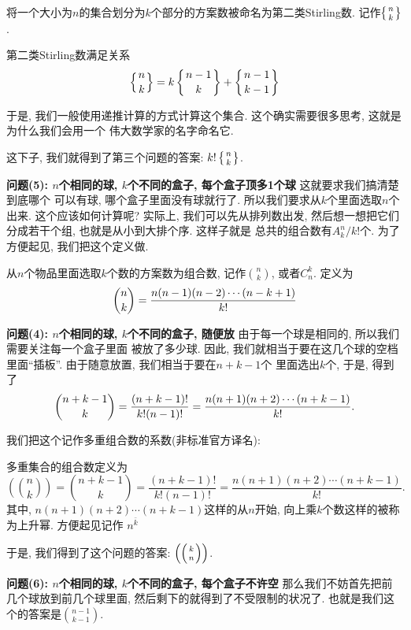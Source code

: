 \begin{definition}[第二类Stirling数]
    将一个大小为$n$的集合划分为$k$个部分的方案数被命名为第二类Stirling数. 记作$\left\{{n \atop k}\right\}$.
\end{definition}

\begin{theorem}
    第二类Stirling数满足关系
    $$
        \left\{{n \atop k}\right\}=k\left\{{n-1 \atop k}\right\}+\left\{{n-1 \atop k-1}\right\}
    $$
\end{theorem}

于是, 我们一般使用递推计算的方式计算这个集合. 这个确实需要很多思考, 这就是为什么我们会用一个
伟大数学家的名字命名它.

这下子, 我们就得到了第三个问题的答案: $k! \left\{{n \atop k}\right\}$.

\textbf{问题(5): $n$个相同的球, $k$个不同的盒子, 每个盒子顶多1个球  } 这就要求我们搞清楚到底哪个
可以有球, 哪个盒子里面没有球就行了. 所以我们要求从$k$个里面选取$n$个出来. 这个应该如何计算呢?
实际上, 我们可以先从排列数出发, 然后想一想把它们分成若干个组, 也就是从小到大排个序. 这样子就是
总共的组合数有$A_k^n/k!$个. 为了方便起见, 我们把这个定义做.

\begin{definition}[组合数]
    从$n$个物品里面选取$k$个数的方案数为组合数, 记作${n\choose k}$, 或者$C_n^k$. 定义为
    $$
        {n\choose k}={n(n-1)(n-2)\cdots(n-k+1)\over k!}
    $$
\end{definition}


\textbf{问题(4): $n$个相同的球, $k$个不同的盒子, 随便放  } 由于每一个球是相同的, 所以我们需要关注每一个盒子里面
被放了多少球. 因此, 我们就相当于要在这几个球的空档里面``插板''. 由于随意放置, 我们相当于要在$n+k-1$个
里面选出$k$个, 于是, 得到了
$$
    {n+k-1\choose k} = \frac{(n+k-1)!}{k!(n-1)!} = {n(n+1)(n+2)\cdots(n+k-1)\over k!}.
$$

我们把这个记作多重组合数的系数(非标准官方译名):

\begin{definition}[多重集合组合数]
    多重集合的组合数定义为
    $$
        \left(\binom nk\right)=\binom{n+k-1}k=\frac{(n+k-1)!}{k!\left(n-1\right)!}=\frac{n(n+1)(n+2)\cdots(n+k-1)}{k!}.
    $$
    其中, $n(n+1)(n+2)\cdots(n+k-1)$这样的从$n$开始, 向上乘$k$个数这样的被称为上升幂. 方便起见记作
    $n^{\bar k}$
\end{definition}
于是, 我们得到了这个问题的答案: $\left(\left({k \atop n}\right)\right)$.

\textbf{问题(6): $n$个相同的球, $k$个不同的盒子, 每个盒子不许空  } 那么我们不妨首先把前几个球放到前几个球里面,
然后剩下的就得到了不受限制的状况了. 也就是我们这个的答案是${n-1\choose k-1}. $

